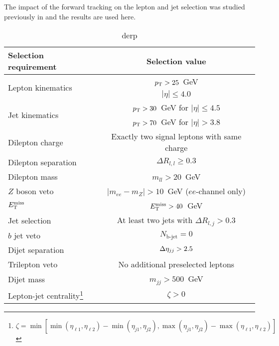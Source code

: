 
The impact of the forward tracking on the lepton and jet selection was studied previously in \cite{2017.ssww-upgrade} and the results are used here.

\begin{table}[htb]
  \centering
  \begin{tabular}{l|c}
    Selection requirement              & Selection value \\
    \hline\hline
    \multirow{2}{*}{Lepton kinematics} & $p_{\mathrm{T}} > 25$~GeV \\
                                       & $|\eta| \le 4.0$ \\
    \multirow{2}{*}{Jet kinematics}    & $p_{\mathrm{T}} > 30$~GeV for $|\eta| \le 4.5$ \\
                                       & $p_{\mathrm{T}} > 70$~GeV for $|\eta| > 3.8$ \\
    \hline
    Dilepton charge                    & Exactly two signal leptons with same charge\\
    Dilepton separation                & $\Delta R_{l,l} \ge 0.3$ \\
    Dilepton mass                      & $m_{ll} > 20$~GeV\\
    $Z$ boson veto                     & $|m_{ee} - m_Z| > 10$~GeV ($ee$-channel only) \\
    $E_{\mathrm{T}}^{\mathrm{miss}}$                             & $E_{\mathrm{T}}^{\mathrm{miss}} > 40$~GeV \\
    Jet selection                      & At least two jets with $\Delta R_{l,j} > 0.3$\\
    $b$ jet veto                       & $N_{\textrm{b-jet}} = 0$\\
    Dijet separation                   & $\detajj > 2.5$\\
    Trilepton veto                     & No additional preselected leptons\\
    Dijet mass                         & $m_{jj} > 500$~GeV\\
    Lepton-jet centrality\footnote{$\zeta = \min [\min (\eta_{\ell1}, \eta_{\ell2} )-\min(\eta_{j1},\eta_{j2}), \max(\eta_{j1},\eta_{j2})-\max(\eta_{\ell1},\eta_{\ell2}) ]$}                                    & $\zeta > 0$\\
    \hline
  \end{tabular}
  \caption{derp}
  \label{tab:sswwupgrade_event_selection}
\end{table}
